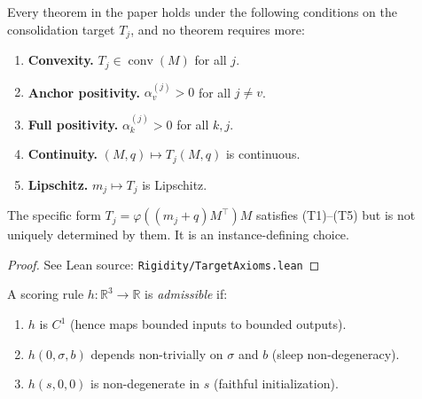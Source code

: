 \begin{proposition}
\label{prop:target_axioms}
\leanok
{}
Every theorem in the paper holds under the following conditions on the consolidation target $T_j$, and no theorem requires more:
\begin{enumerate}
\item \textbf{Convexity.} $T_j \in \operatorname{conv}(M)$ for all $j$.
\item \textbf{Anchor positivity.} $\alpha_v^{(j)} > 0$ for all $j \neq v$.
\item \textbf{Full positivity.} $\alpha_k^{(j)} > 0$ for all $k, j$.
\item \textbf{Continuity.} $(M, q) \mapsto T_j(M, q)$ is continuous.
\item \textbf{Lipschitz.} $m_j \mapsto T_j$ is Lipschitz.
\end{enumerate}
The specific form $T_j = \varphi((m_j + q)M^\top)M$ satisfies \textnormal{(T1)--(T5)} but is not uniquely determined by them.  It is an instance-defining choice.
\end{proposition}

\begin{proof}
\leanok
{}
See Lean source: \texttt{Rigidity/TargetAxioms.lean}
\end{proof}

\begin{definition}
\label{def:admissible_scoring}
\leanok
A scoring rule $h\colon \mathbb{R}^3 \to \mathbb{R}$ is \emph{admissible} if:
\begin{enumerate}
\item $h$ is $C^1$ (hence maps bounded inputs to bounded outputs).
\item $h(0, \sigma, b)$ depends non-trivially on $\sigma$ and $b$ (sleep non-degeneracy).
\item $h(s, 0, 0)$ is non-degenerate in $s$ (faithful initialization).
\end{enumerate}
\end{definition}

